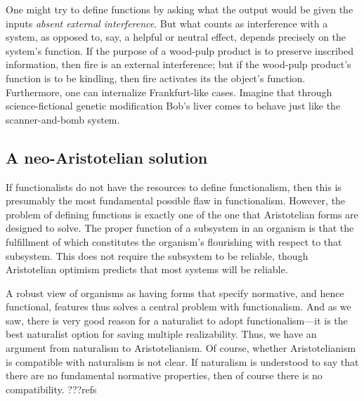 One might try to define functions by asking what the output would be given the inputs \textit{absent external interference}. 
But what counts as interference with a system, as opposed to, say, a helpful or neutral effect, depends precisely on the system's
function. If the purpose of a wood-pulp product is to preserve inscribed information, then fire is an external interference;
but if the wood-pulp product's function is to be kindling, then fire activates its the object's function. 
Furthermore, one can internalize Frankfurt-like cases. Imagine that through science-fictional genetic modification Bob's liver
comes to behave just like the scanner-and-bomb system. 

\subsection{A neo-Aristotelian solution}
If functionalists do not have the resources to define functionalism, then this is presumably the most fundamental possible flaw
in functionalism. However, the problem of defining functions is exactly one of the one that Aristotelian forms are designed to solve.  The proper function
of a subsystem in an organism is that the fulfillment of which constitutes the organism's flourishing with respect to that subsystem.
This does not require the subsystem to be reliable, though Aristotelian optimism predicts that most systems will be reliable. 

A robust view of organisms as having forms that specify normative, and hence functional, features thus solves a central
problem with functionalism. And as we saw, there is very good reason for a naturalist to adopt functionalism---it is the
best naturalist option for saving multiple realizability. Thus, we have an argument from naturalism to Aristotelianism.
Of course, whether Aristotelianism is compatible with naturalism is not clear. If naturalism is understood to say that 
there are no fundamental normative properties, then of course there is no compatibility.
???refs

